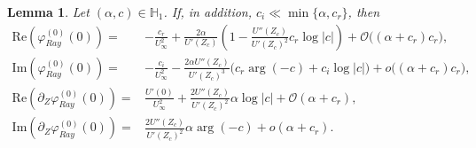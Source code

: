 \documentclass[reqno,11pt]{amsart}
\numberwithin{equation}{section}
\numberwithin{equation}{section}
\theoremstyle{plain}
\newtheorem{lemma}[theorem]{Lemma}
\begin{document}
\begin{lemma}\label{lem:ray-main-asy}
	Let $(\alpha, c)\in\mathbb{H}_1$. If, in addition, $c_i\ll \min\{\alpha, c_r\}$, then
	\begin{align}
		\mathrm{Re}\left(\varphi_{Ray}^{(0)}(0)\right)= & -\frac{c_r}{U_\infty^2}+ \frac{2\alpha}{U'(Z_c)}\left(1-\frac{U''(Z_c)}{U'(Z_c)^2}c_r\log|c|\right) +\mathcal{O}\big((\alpha+c_r)c_r\big),\label{Re1} \\
		\mathrm{Im}\left(\varphi_{Ray}^{(0)}(0)\right)= &  -\frac{c_i}{U_\infty^2}- \frac{2\alpha U''(Z_c)}{U'(Z_c)^3}\Big(c_r\arg(-c)+c_i\log|c|\Big)
		+o\big((\alpha+c_r)c_r\big),\label{Im1}\\
		\mathrm{Re}\left(\partial_Z\varphi_{Ray}^{(0)}(0)\right)=&\frac{U'(0)}{U_\infty^2}+\frac{2U''(Z_c)}{U'(Z_c)^2}\alpha\log|c|
		+\mathcal{O}(\alpha+c_r),\label{Re2}\\
		\mathrm{Im} \left(\partial_Z\varphi_{Ray}^{(0)}(0)\right)=&\frac{2U''(Z_c)}{U'(Z_c)^2}\alpha\arg(-c)
		+o(\alpha+c_r).\label{Im2}
	\end{align}
\end{lemma}
\end{document}
